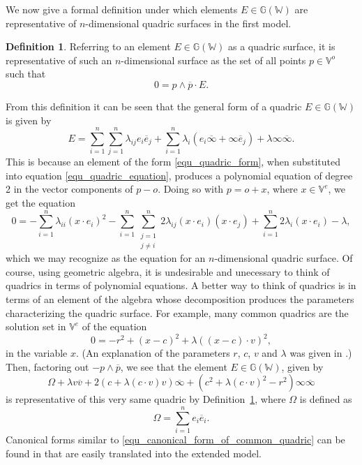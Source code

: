 \documentclass{birkjour}
\theoremstyle{definition}
\newtheorem{defn}[thm]{Definition}
\theoremstyle{remark}
\numberwithin{equation}{section}
\newcommand{\G}{\mathbb{G}}
\newcommand{\V}{\mathbb{V}}
\newcommand{\W}{\mathbb{W}}
\newcommand{\nvao}{o}
\newcommand{\nvai}{\infty}
\newcommand{\nvaib}{\overline{\infty}}
\begin{document}
We now give a formal definition under which elements $E\in\G(\W)$
are representative of $n$-dimensional quadric surfaces in the first model.
\begin{defn}\label{def_quadric}
Referring to an element $E\in\G(\W)$ as a quadric surface, it is representative of such an $n$-dimensional
surface as the set of all points $p\in\V^o$ such that
\begin{equation}\label{equ_quadric_equation}
0 = p\wedge\overline{p}\cdot E.
\end{equation}
\end{defn}
From this definition it can be seen that the general form of a quadric $E\in\G(\W)$ is given by
\begin{equation}\label{equ_quadric_form}
E = \sum_{i=1}^n\sum_{j=1}^n\lambda_{ij}e_i\overline{e}_j+
\sum_{i=1}^n\lambda_i(e_i\nvaib + \nvai\overline{e}_j)+
\lambda\nvai\nvaib.
\end{equation}
This is because an element of the form \eqref{equ_quadric_form}, when
substituted into equation \eqref{equ_quadric_equation}, produces a polynomial
equation of degree 2 in the vector components of $p-\nvao$.
Doing so with $p=\nvao+x$, where $x\in\V^e$, we get the equation
\begin{equation}
0 = -\sum_{i=1}^n\lambda_{ii}(x\cdot e_i)^2-
\sum_{i=1}^n\sum_{\substack{j=1\\j\neq i}}^n 2\lambda_{ij}(x\cdot e_i)(x\cdot e_j)+
\sum_{i=1}^n 2\lambda_i(x\cdot e_i) - \lambda,
\end{equation}
which we may recognize as the equation for an $n$-dimensional quadric surface.
Of course, using geometric algebra, it is undesirable and unecessary to think of
quadrics in terms of polynomial equations.  A better way to think of quadrics is in terms
of an element of the algebra whose decomposition
produces the parameters characterizing the quadric surface.  For example, many common
quadrics are the solution set in $\V^e$ of the equation
\begin{equation}
0 = -r^2 + (x-c)^2 + \lambda((x-c)\cdot v)^2,
\end{equation}
in the variable $x$.  (An explanation of the parameters $r$, $c$, $v$ and $\lambda$
was given in \cite{Parkin12}.)  Then, factoring out $-p\wedge\overline{p}$, we see that
the element $E\in\G(\W)$, given by
\begin{equation}\label{equ_canonical_form_of_common_quadric}
\Omega + \lambda v\overline{v}+2(c+\lambda(c\cdot v)v)\nvaib+
(c^2+\lambda (c\cdot v)^2-r^2)\nvai\nvaib
\end{equation}
is representative of this very same quadric by Definition~\ref{def_quadric},
where $\Omega$ is defined as
\begin{equation}
\Omega = \sum_{i=1}^n e_i\overline{e}_i.
\end{equation}
Canonical forms similar to \eqref{equ_canonical_form_of_common_quadric}
can be found in \cite{Parkin12} that are easily translated into the extended model.
\end{document}
